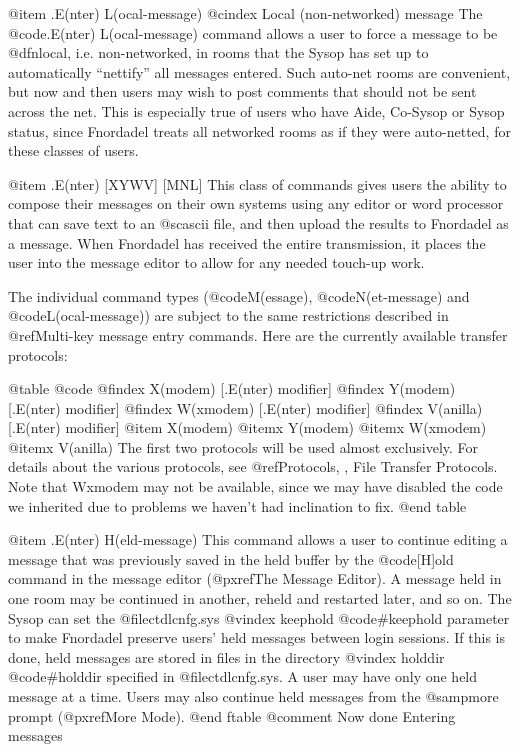 @item .E(nter) L(ocal-message)
@cindex Local (non-networked) message
The @code{.E(nter) L(ocal-message)} command allows a user to force a message
to be @dfn{local}, i.e. non-networked, in rooms that the Sysop has set up to
automatically ``nettify'' all messages entered.  Such auto-net rooms are
convenient, but now and then users may wish to post comments that
should not be
sent across the net.  This is especially true of users who have Aide,
Co-Sysop or Sysop status, since Fnordadel treats all networked rooms as if they
were auto-netted, for these classes of users.

@item .E(nter) [XYWV] [MNL]
This class of commands gives users the ability to compose
their messages on their own systems using any editor or word processor
that can save text to an @sc{ascii} file, and then upload the results to
Fnordadel as a message.  When Fnordadel has received the entire
transmission, it places the user into the message editor to allow for
any needed touch-up work.

The individual command types (@code{M(essage)}, @code{N(et-message)}
and @code{L(ocal-message)})
are subject to the same restrictions described in
@ref{Multi-key message entry commands}.
Here are the currently available transfer protocols:

@table @code
@findex X(modem) [.E(nter) modifier]
@findex Y(modem) [.E(nter) modifier]
@findex W(xmodem) [.E(nter) modifier]
@findex V(anilla) [.E(nter) modifier]
@item X(modem)
@itemx Y(modem)
@itemx W(xmodem)
@itemx V(anilla)
The first two protocols will be used almost exclusively.  For
details about the various protocols, see
@ref{Protocols, , File Transfer Protocols}.  Note that Wxmodem
may not be available, since we may have disabled the code we
inherited due to problems we haven't had inclination to fix.
@end table

@item .E(nter) H(eld-message)
This command allows a user to continue editing a message that
was previously saved in the held buffer by the @code{[H]old} command in the
message editor (@pxref{The Message Editor}).  A message held in one room may
be continued in another, reheld and restarted later, and so on.  The
Sysop can set the @file{ctdlcnfg.sys}
@vindex keephold
@code{#keephold} parameter to make Fnordadel
preserve users' held messages between login sessions.  If this is done,
held messages are stored in files in the directory
@vindex holddir
@code{#holddir} specified
in @file{ctdlcnfg.sys}.  A user may have only one held message at a time.
Users may also continue held
messages from the @samp{more} prompt (@pxref{More Mode}).
@end ftable
@comment Now done Entering messages

